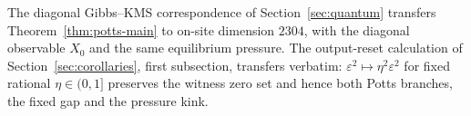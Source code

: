 The diagonal Gibbs--KMS correspondence of Section~\ref{sec:quantum} transfers Theorem~\ref{thm:potts-main} to on-site dimension $2304$, with the diagonal observable $X_0$ and the same equilibrium pressure. The output-reset calculation of Section~\ref{sec:corollaries}, first subsection, transfers verbatim: $\varepsilon^2\mapsto\eta^2\varepsilon^2$ for fixed rational $\eta\in(0,1]$ preserves the witness zero set and hence both Potts branches, the fixed gap and the pressure kink.